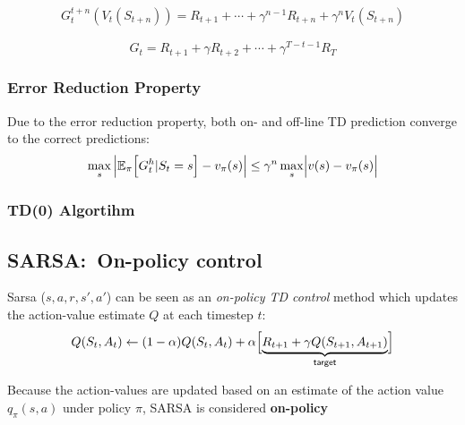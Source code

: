 \newpar{}
\noindent\begin{align*}
    G_t^{t+n}(V_t(S_{t+n})) = R_{t+1} + \cdots + \gamma^{n-1}R_{t+n} + \gamma^n V_t(S_{t+n})
\end{align*}

\newpar{}
\noindent\begin{equation*}
    G_t = R_{t+1}+\gamma R_{t+2} + \cdots + \gamma^{T-t-1}R_T
\end{equation*}

\subsubsection{Error Reduction Property}
Due to the error reduction property, both on- and off-line TD prediction converge to the correct predictions:
\noindent\begin{equation*}
    \max_s \left|\mathbb{E}_\pi\Bigl[G_t^h | S_t=s\Bigr] - v_\pi(s)\right| \leq \gamma^n \max_s \Bigl|v(s) - v_\pi(s)\Bigr|
\end{equation*}

\subsubsection{TD(0) Algortihm}%
\begin{algorithmic}
    \EndWhile{}
    \EndFor{}
\end{algorithmic}

\subsection{SARSA:\ On-policy control}
Sarsa ($s,a,r,s',a'$) can be seen as an \textit{on-policy TD control} method which updates the action-value estimate $Q$ at each timestep $t$:
\noindent\begin{equation*}
    Q(S_t, A_t) \gets (1-\alpha)Q(S_t, A_t) + \alpha \Bigl[\underbrace{R_{t+1} + \gamma Q(S_{t+1}, A_{t+1})}_{\textsf{target}} \Bigr]
\end{equation*}

Because the action-values are updated based on an estimate of the action value $q_\pi(s,a)$ under policy $\pi$, SARSA is considered \textbf{on-policy}

